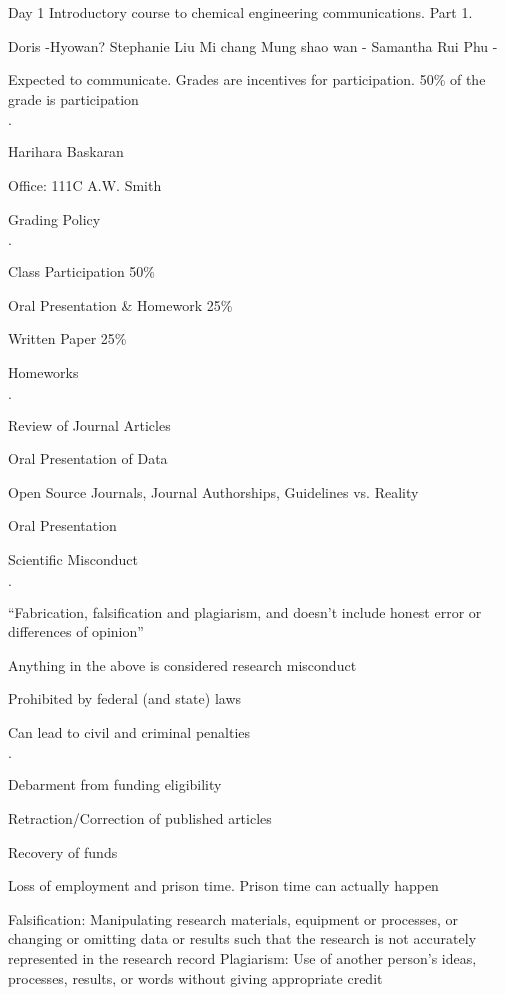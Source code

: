 \documentclass{article}
\begin{document}
\begin{section}{Day 1}
  Introductory course to chemical engineering communications. Part 1.

  Doris -Hyowan?
  Stephanie
  Liu
  Mi chang
  Mung shao wan - Samantha
  Rui Phu -

  Expected to communicate. Grades are incentives for participation. 50\% of the grade is participation

  \begin{list}{$\cdot$}{}
  \item Harihara Baskaran
  \item Office: 111C A.W. Smith
  \end{list}
  Grading Policy\begin{list}{$\cdot$}{}
  \item Class Participation 50\%
  \item Oral Presentation \& Homework 25\%
  \item Written Paper 25\%
  \end{list}
  Homeworks\begin{list}{$\cdot$}{}
  \item Review of Journal Articles
  \item Oral Presentation of Data
  \item Open Source Journals, Journal Authorships, Guidelines vs. Reality
  \item Oral Presentation
  \end{list}
  Scientific Misconduct\begin{list}{$\cdot$}{}
  \item ``Fabrication, falsification and plagiarism, and doesn't include honest error or differences of opinion''
  \item Anything in the above is considered research misconduct
  \item Prohibited by federal (and state) laws
  \item Can lead to civil and criminal penalties
    \begin{list}{$\cdot$}{}
    \item Debarment from funding eligibility
    \item Retraction/Correction of published articles
    \item Recovery of funds
    \item Loss of employment and prison time. Prison time can actually happen
    \end{list}
  \end{list}
  Falsification: Manipulating research materials, equipment or processes, or changing or omitting data or results such that the research is not accurately represented in the research record
  Plagiarism: Use of another person's ideas, processes, results, or words without giving appropriate credit


\end{section}
\end{document}
